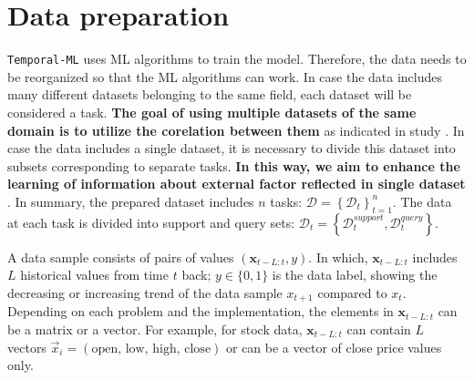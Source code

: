 \section{Data preparation}
\label{sec:data_prep}


\verb|Temporal-ML| uses ML algorithms to train the model. Therefore, the data needs to be reorganized so that the ML algorithms can work. In case the data includes many different datasets belonging to the same field, each dataset will be considered a task. \textbf{The goal of using multiple datasets of the same domain is to utilize the corelation between them} as indicated in study \cite{overreactioncontrarian, mech1993portfolio}. In case the data includes a single dataset, it is necessary to divide this dataset into subsets corresponding to separate tasks. \textbf{In this way, we aim to enhance the learning of information about external factor reflected in single dataset} \cite{fama1970efficient}. In summary, the prepared dataset includes $n$ tasks: $\mathcal{D} = \left\{ \mathcal{D}_t \right\}_{t=1}^{n}$. The data at each task is divided into support and query sets: $\mathcal{D}_t = \left\{ \mathcal{D}_t^{support}, \mathcal{D}_t^{query} \right\}$.


A data sample consists of pairs of values $(\mathbf{x}_{t-L:t}, y)$. In which, $\mathbf{x}_{t-L:t}$ includes $L$ historical values from time $t$ back; $y\in \{0,1\}$ is the data label, showing the decreasing or increasing trend of the data sample $x_{t+1}$ compared to $x_{t}$. Depending on each problem and the implementation, the elements in $\mathbf{x}_{t-L:t}$ can be a matrix or a vector. For example, for stock data, $\mathbf{x}_{t-L:t}$ can contain $L$ vectors $\vec x_i = (\text{open, low, high, close})$ or can be a vector of close price values only.

